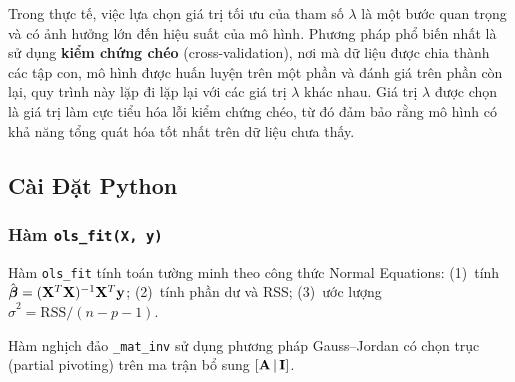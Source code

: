 \begin{note}
Trong thực tế, việc lựa chọn giá trị tối ưu của tham số $\lambda$ là một bước quan trọng và có ảnh hưởng lớn đến hiệu suất của mô hình. Phương pháp phổ biến nhất là sử dụng \textbf{kiểm chứng chéo} (cross-validation), nơi mà dữ liệu được chia thành các tập con, mô hình được huấn luyện trên một phần và đánh giá trên phần còn lại, quy trình này lặp đi lặp lại với các giá trị $\lambda$ khác nhau. Giá trị $\lambda$ được chọn là giá trị làm cực tiểu hóa lỗi kiểm chứng chéo, từ đó đảm bảo rằng mô hình có khả năng tổng quát hóa tốt nhất trên dữ liệu chưa thấy.
\end{note}

\subsection{Cài Đặt Python}

\subsubsection{Hàm \texttt{ols\_fit(X, y)}}


Hàm \texttt{ols\_fit} tính toán tường minh theo công thức Normal Equations:
(1)~tính $\hat{\boldsymbol{\beta}} = (\mathbf{X}^T\mathbf{X})^{-1}\mathbf{X}^T\mathbf{y}$;
(2)~tính phần dư và RSS; (3)~ước lượng $\hat{\sigma}^2 = \mathrm{RSS}/(n-p-1)$.

\begin{note}
Hàm nghịch đảo \texttt{\_mat\_inv} sử dụng phương pháp Gauss--Jordan có chọn trục
(partial pivoting) trên ma trận bổ sung $[\mathbf{A}\,|\,\mathbf{I}]$.
\end{note}


